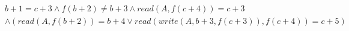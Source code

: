 \begin{align*}
%
& %
b + 1 = c + 3
%
\land
%
f(b + 2)  \neq  b + 3
%
\land
%
\mathit{read}(A,f(c + 4)) = c + 3
~\\~
& %
%
\land
%
(\mathit{read}(A,f(b + 2)) = b + 4 \lor \mathit{read}(\mathit{write}(A,b + 3,f(c + 3)),f(c + 4)) = c + 5)
%
\end{align*}
